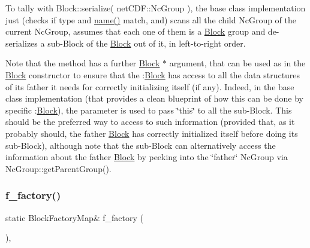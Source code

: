 To tally with Block\+::serialize( net\+C\+D\+F\+::\+Nc\+Group ), the base class implementation just (checks if type and \mbox{\hyperlink{class_s_m_spp__di__unipi__it_1_1_block_a738e9dfd6e00507da219e4bd5a3f6be9}{name()}} match, and) scans all the child Nc\+Group of the current Nc\+Group, assumes that each one of them is a \mbox{\hyperlink{class_s_m_spp__di__unipi__it_1_1_block}{Block}} group and de-\/serializes a sub-\/\+Block of the \mbox{\hyperlink{class_s_m_spp__di__unipi__it_1_1_block}{Block}} out of it, in left-\/to-\/right order.

Note that the method has a further \mbox{\hyperlink{class_s_m_spp__di__unipi__it_1_1_block}{Block}} $\ast$ argument, that can be used as in the \mbox{\hyperlink{class_s_m_spp__di__unipi__it_1_1_block}{Block}} constructor to ensure that the \+:\mbox{\hyperlink{class_s_m_spp__di__unipi__it_1_1_block}{Block}} has access to all the data structures of its father it needs for correctly initializing itself (if any). Indeed, in the base class implementation (that provides a clean blueprint of how this can be done by specific \+:\mbox{\hyperlink{class_s_m_spp__di__unipi__it_1_1_block}{Block}}), the parameter is used to pass \char`\"{}this\char`\"{} to all the sub-\/\+Block. This should be the preferred way to access to such information (provided that, as it probably should, the father \mbox{\hyperlink{class_s_m_spp__di__unipi__it_1_1_block}{Block}} has correctly initialized itself before doing its sub-\/\+Block), although note that the sub-\/\+Block can alternatively access the information about the father \mbox{\hyperlink{class_s_m_spp__di__unipi__it_1_1_block}{Block}} by peeking into the \char`\"{}father\char`\"{} Nc\+Group via Nc\+Group\+::get\+Parent\+Group(). \mbox{\label{class_s_m_spp__di__unipi__it_1_1_block_aca05cf94fb99b94e53cda94695f54551}} 
\subsubsection{\texorpdfstring{f\+\_\+factory()}{f\_factory()}}
{\footnotesize\ttfamily static Block\+Factory\+Map\& f\+\_\+factory (\begin{DoxyParamCaption}\item[{void}]{ }\end{DoxyParamCaption})\hspace{0.3cm}{\ttfamily [static]}, {\ttfamily [protected]}}



